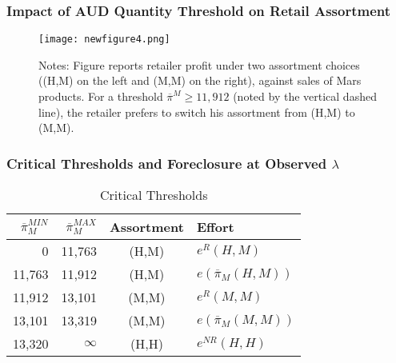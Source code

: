 \documentclass[aspectratio=169]{beamer}
\begin{document}
\begin{frame}
\frametitle{Impact of AUD Quantity Threshold on Retail Assortment}

 \begin{figure}[h!]
\begin{center}
\vspace{-0.1in}
\texttt{[image: newfigure4.png]}
\label{fig:threshold}
\end{center}
\tiny
Notes: Figure reports retailer profit under two assortment choices ((H,M) on the left and (M,M) on the right), against sales of Mars products.  For a threshold $\overline{\pi}^M \geq 11,912$ (noted by the vertical dashed line), the retailer prefers to switch his assortment from (H,M) to (M,M).
\end{figure}
\end{frame}

\begin{frame}
\frametitle{Critical Thresholds and Foreclosure at Observed $\lambda$}
\begin{table}[htp]
\caption{Critical Thresholds}
\begin{center}
\begin{tabular}{|r r c l|}
\hline
$\overline{\pi}_M^{MIN}$ & $\overline{\pi}_M^{MAX}$ & Assortment & Effort \\ \hline \hline
0 & 11,763 & (H,M) & $e^R(H,M)$ \\
11,763 & 11,912 & (H,M) & $e(\overline{\pi}_M(H,M))$ \\
11,912 & 13,101 & (M,M) & $e^R(M,M)$ \\
13,101 & 13,319 & (M,M) & $e(\overline{\pi}_M(M,M))$ \\
13,320 & $\infty$ & (H,H) & $e^{NR}(H,H)$ \\ \hline
\end{tabular}
\end{center}
\label{tab:thresholdsnew}
\end{table}

\end{frame}
\end{document}
